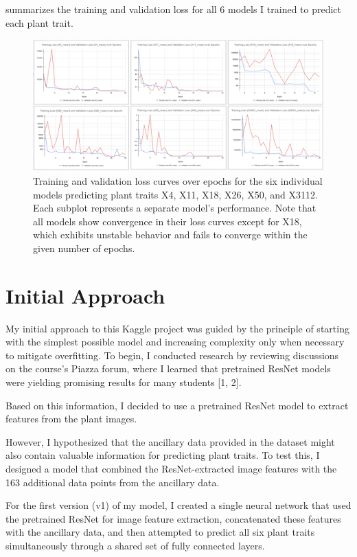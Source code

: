 \documentclass{article}
\begin{document}
 summarizes the training and validation loss for all 6 models I trained to predict each plant trait.

\begin{figure}[h]
\centering
\includegraphics[width=1.0 \textwidth]{1_allLosses.png}
\caption{Training and validation loss curves over epochs for the six individual models predicting plant traits X4, X11, X18, X26, X50, and X3112. Each subplot represents a separate model's performance. Note that all models show convergence in their loss curves except for X18, which exhibits unstable behavior and fails to converge within the given number of epochs.}
\label{fig:trait_model_losses}
\end{figure}

\section{Initial Approach}

My initial approach to this Kaggle project was guided by the principle of starting with the simplest possible model and increasing complexity only when necessary to mitigate overfitting. To begin, I conducted research by reviewing discussions on the course's Piazza forum, where I learned that pretrained ResNet models were yielding promising results for many students [1, 2].

Based on this information, I decided to use a pretrained ResNet model to extract features from the plant images.

However, I hypothesized that the ancillary data provided in the dataset might also contain valuable information for predicting plant traits. To test this, I designed a model that combined the ResNet-extracted image features with the 163 additional data points from the ancillary data.

For the first version (v1) of my model, I created a single neural network that used the pretrained ResNet for image feature extraction, concatenated these features with the ancillary data, and then attempted to predict all six plant traits simultaneously through a shared set of fully connected layers.
\end{document}
